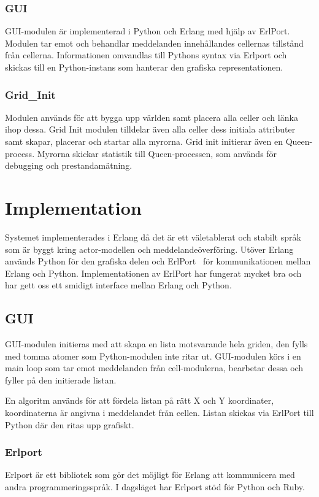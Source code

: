 \documentclass[12pt]{article}
\begin{document}
\subsubsection{GUI}
GUI-modulen är implementerad i Python och Erlang med hjälp av ErlPort.
Modulen tar emot och behandlar meddelanden innehållandes cellernas tillstånd från cellerna.
Informationen omvandlas till Pythons syntax via Erlport och skickas till en Python-instans som hanterar den grafiska representationen.

\subsubsection{Grid\_Init}
Modulen används för att bygga upp världen samt placera alla celler och länka ihop dessa.
Grid Init modulen tilldelar även alla celler dess initiala attributer samt skapar,
placerar och startar alla myrorna. Grid init initierar även en Queen-process.
Myrorna skickar statistik till Queen-processen,
som används för debugging och prestandamätning.

\section{Implementation}\label{sec:implementation}
Systemet implementerades i Erlang då det är ett väletablerat och stabilt språk som är byggt kring actor-modellen och meddelandeöverföring.
Utöver Erlang används Python för den grafiska delen och ErlPort~\cite{erlport} för kommunikationen mellan Erlang och Python.
Implementationen av ErlPort har fungerat mycket bra och har gett oss ett smidigt interface mellan Erlang och Python.

\subsection{GUI}
GUI-modulen initieras med att skapa en lista motsvarande hela griden,
den fylls med tomma atomer som Python-modulen inte ritar ut.
GUI-modulen körs i en main loop som tar emot meddelanden från cell-modulerna,
bearbetar dessa och fyller på den initierade listan.

En algoritm används för att fördela listan på rätt X och Y koordinater,
koordinaterna är angivna i meddelandet från cellen.
Listan skickas via ErlPort till Python där den ritas upp grafiskt.

\subsubsection{Erlport}
Erlport är ett bibliotek som gör det möjligt för Erlang att kommunicera med andra programmeringsspråk.
I dagsläget har Erlport stöd för Python och Ruby.
\end{document}
